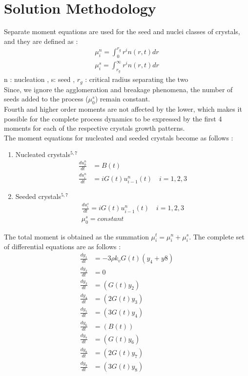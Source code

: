 
\section{Solution Methodology}

Separate moment equations are used for the seed and nuclei classes of crystals, and they are defined as : 
\begin{align}
\mu^{n}_{i} = \int_{0}^{r_{g}} r^{i}n(r,t) dr \\
\mu^{s}_{i} = \int_{r_{g}}^{\infty} r^{i}n(r,t) dr
\end{align}
n : nucleation , s: seed , $r_{g}$  : critical radius separating the two \\  
Since, we ignore the agglomeration and breakage phenomena, the number of seeds added to the process ($\mu_{0}^{s}$) remain constant.\\
Fourth and higher order moments are not affected by the lower, which makes it possible for the complete process dynamics to be expressed by the first 4 moments for each of the respective crystals growth patterns.\\
The moment equations for nucleated and seeded crystals become as follows\cite{yenkie} :

\begin{enumerate}

\item Nucleated crystals$^{5,7}$ 
\begin{align}
\frac{du_{0}^{n}}{dt} &= B(t) \\
\frac{du_{i}^{n}}{dt} &= iG(t)u_{i-1}^{n}(t) \quad  i = 1,2,3
\end{align}

\item Seeded crystals$^{5,7}$
\begin{align}
\frac{du_{i}^{s}}{dt} = iG(t)u_{i-1}^{n}(t) \quad  i = 1,2,3 \\
\mu_{0}^{s} = constant
\end{align}

\end{enumerate}
The total moment is obtained as the summation $\mu_{i}^{t} = \mu_{i}^{n} + \mu_{i}^{s}$. 
The complete set of differential equations are as follows\cite{yenkie} :
\begin{align} \label{modeleq}
\frac{dy_{1}}{dt} &= -3\rho k_{v}G(t)(y_{4}+y{8}) \\
\frac{dy_{2}}{dt} &= 0 \\
\frac{dy_{3}}{dt} &= (G(t)y_{2})  \\
\frac{dy_{4}}{dt} &= (2G(t)y_{3}) \\
\frac{dy_{5}}{dt} &= (3G(t)y_{4}) \\
\frac{dy_{6}}{dt} &= (B(t))  \\
\frac{dy_{7}}{dt} &= (G(t)y_{6})  \\
\frac{dy_{8}}{dt} &= (2G(t)y_{7})  \\
\frac{dy_{9}}{dt} &= (3G(t)y_{8})  \\
\end{align} 
